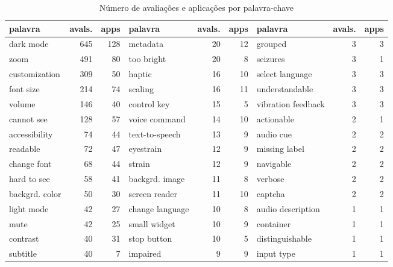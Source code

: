 \begin{table}[!htb]
\centering
\small
\setlength{\tabcolsep}{3pt}
\caption{Número de avaliações e aplicações por palavra-chave}
\label{tab:keywords-reviews}
\begin{tabular}{lrr||lrr||lrr}
\hline
palavra          & avals.  & apps & palavra          & avals.  & apps &  palavra           & avals.  & apps \\
\hline
dark mode        & 645     & 128  & metadata         & 20      & 12   & grouped            & 3       & 3    \\
zoom             & 491     & 80   & too bright       & 20      & 8    & seizures           & 3       & 1    \\
customization    & 309     & 50   & haptic           & 16      & 10   & select language    & 3       & 3    \\
font size        & 214     & 74   & scaling          & 16      & 11   & understandable     & 3       & 3    \\
volume           & 146     & 40   & control key      & 15      & 5    & vibration feedback & 3       & 3    \\
cannot see       & 128     & 57   & voice command    & 14      & 10   & actionable         & 2       & 1    \\
accessibility    & 74      & 44   & text-to-speech   & 13      & 9    & audio cue          & 2       & 2    \\
readable         & 72      & 47   & eyestrain        & 12      & 9    & missing label      & 2       & 2    \\
change font      & 68      & 44   & strain           & 12      & 9    & navigable          & 2       & 2    \\
hard to see      & 58      & 41   & backgrd. image   & 11      & 8    & verbose            & 2       & 2    \\
backgrd. color   & 50      & 30   & screen reader    & 11      & 10   & captcha            & 2       & 2    \\
light mode       & 42      & 27   & change language  & 10      & 8    & audio description  & 1       & 1    \\
mute             & 42      & 25   & small widget     & 10      & 9    & container          & 1       & 1    \\
contrast         & 40      & 31   & stop button      & 10      & 5    & distinguishable    & 1       & 1    \\
subtitle         & 40      & 7    & impaired         & 9       & 9    & input type         & 1       & 1    \\

\end{tabular}
\end{table}

